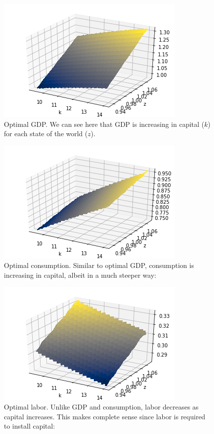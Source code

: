 \documentclass[12pt]{article}
\begin{document}
\begin{doublespace}
\begin{figure}[h]
\caption{Optimal GDP. We can see here that GDP is increasing in capital ($k$) for each state of the world ($z$).}
\includegraphics{3d_gdp_plot_nz15_nk500}
\end{figure}

\begin{figure}[h]
\caption{Optimal consumption. Similar to optimal GDP, consumption is increasing in capital, albeit in a much steeper way:}
\includegraphics{3d_consumption_plot_nz15_nk500}
\end{figure}

\begin{figure}[h]
\caption{Optimal labor. Unlike GDP and consumption, labor decreases as capital increases. This makes complete sense since labor is required to install capital:}
\includegraphics{3d_labor_plot_nz15_nk500}
\end{figure}


\end{doublespace}
\end{document}
